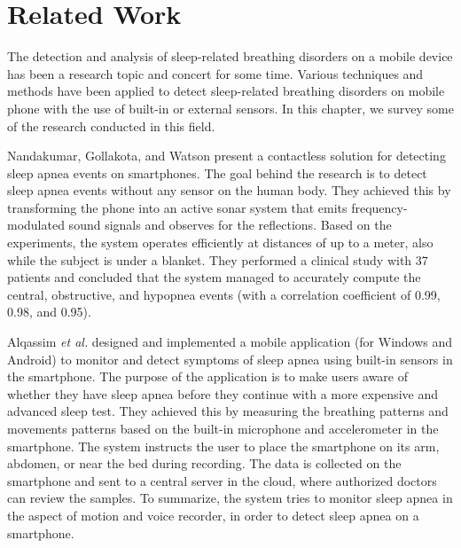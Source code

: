 \chapter{Related Work}
The detection and analysis of sleep-related breathing disorders on a mobile device has been a research topic and concert for some time. Various techniques and methods have been applied to detect sleep-related breathing disorders on mobile phone with the use of built-in or external sensors. In this chapter, we survey some of the research conducted in this field.

Nandakumar, Gollakota, and Watson \cite{contactless_sleep} present a contactless solution for detecting sleep apnea events on smartphones. The goal behind the research is to detect sleep apnea events without any sensor on the human body. They achieved this by transforming the phone into an active sonar system that emits frequency-modulated sound signals and observes for the reflections. Based on the experiments, the system operates efficiently at distances of up to a meter, also while the subject is under a blanket. They performed a clinical study with 37 patients and concluded that the system managed to accurately compute the central, obstructive, and hypopnea events (with a correlation coefficient of 0.99, 0.98, and 0.95). 

Alqassim \textit{et al.} \cite{sam} designed and implemented a mobile application (for Windows and Android) to monitor and detect symptoms of sleep apnea using built-in sensors in the smartphone. The purpose of the application is to make users aware of whether they have sleep apnea before they continue with a more expensive and advanced sleep test. They achieved this by measuring the breathing patterns and movements patterns based on the built-in microphone and accelerometer in the smartphone. The system instructs the user to place the smartphone on its arm, abdomen, or near the bed during recording. The data is collected on the smartphone and sent to a central server in the cloud, where authorized doctors can review the samples. To summarize, the system tries to monitor sleep apnea in the aspect of motion and voice recorder, in order to detect sleep apnea on a smartphone. 

